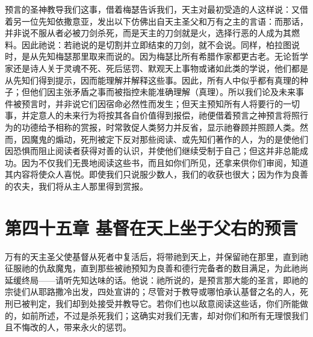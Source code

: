 预言的圣神教导我们这事，借着梅瑟告诉我们，天主对最初受造的人这样说：又借着另一位先知依撒意亚，发出以下仿佛出自天主圣父和万有之主的言语：而那话，并非说不服从者必被刀剑杀死，而是天主的刀剑就是火，选择行恶的人成为其燃料。因此祂说：若祂说的是切割并立即结束的刀剑，就不会说。同样，柏拉图说时，是从先知梅瑟那里取来而说的。因为梅瑟比所有希腊作家都更古老。无论哲学家还是诗人关于灵魂不死、死后惩罚、默观天上事物或诸如此类的学说，他们都是从先知们得到提示，因而能理解并解释这些事。因此，所有人中似乎都有真理的种子；但他们因主张矛盾之事而被指控未能准确理解（真理）。所以我们论及未来事件被预言时，并非说它们因宿命必然性而发生；但天主预知所有人将要行的一切事，并定意人的未来行为将按其各自价值得到报偿，祂便借着预言之神预言将照行为的功德给予相称的赏报，时常敦促人类努力并反省，显示祂眷顾并照顾人类。然而，因魔鬼的煽动，死刑被定下反对那些阅读、或先知们著作的人，为的是使他们因恐惧而阻止阅读者获得对善的认识，并使他们继续受制于自己；但这并非总能成功。因为不仅我们无畏地阅读这些书，而且如你们所见，还拿来供你们审阅，知道其内容将使众人喜悦。即使我们只说服少数人，我们的收获也很大；因为作为良善的农夫，我们将从主人那里得到赏报。\par


\section{第四十五章 基督在天上坐于父右的预言}

万有的天主圣父使基督从死者中复活后，将带祂到天上，并保留祂在那里，直到祂征服祂的仇敌魔鬼，直到那些被祂预知为良善和德行完备者的数目满足，为此祂尚延缓终局——请听先知达味的话。他说：祂所说的，是预言那大能的圣言，即祂的宗徒们从耶路撒冷出发，四处宣讲的；尽管对于教导或哪怕承认基督之名的人，死刑已被判定，我们却到处接受并教导它。若你们也以敌意阅读这些话，你们所能做的，如前所述，不过是杀死我们；这确实对我们无害，却对你们和所有无理恨我们且不悔改的人，带来永火的惩罚。\par

